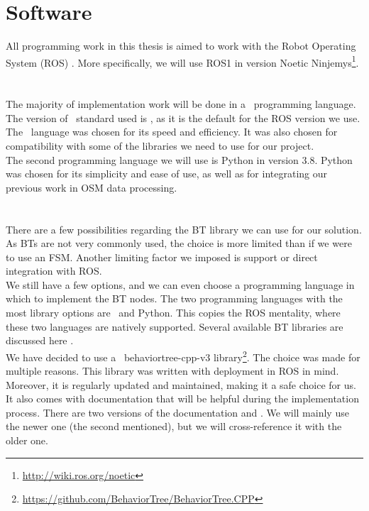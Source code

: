 \section{Software}
    All programming work in this thesis is aimed to work with the Robot Operating System (ROS) \cite{ROS}. More specifically, we will use ROS1 in version Noetic Ninjemys\footnote{\url{http://wiki.ros.org/noetic}}.\\\\
    \\
        The majority of implementation work will be done in a \CC\ programming language. The version of \CC\ standard used is , as it is the default for the ROS version we use.\\
        The \CC\ language was chosen for its speed and efficiency. It was also chosen for compatibility with some of the libraries we need to use for our project.\\
        The second programming language we will use is Python in version 3.8. Python was chosen for its simplicity and ease of use, as well as for integrating our previous work in OSM data processing.\\\\
    \\
        There are a few possibilities regarding the BT library we can use for our solution. As BTs are not very commonly used, the choice is more limited than if we were to use an FSM. Another limiting factor we imposed is support or direct integration with ROS.\\
        We still have a few options, and we can even choose a programming language in which to implement the BT nodes. The two programming languages with the most library options are \CC\ and Python. This copies the ROS mentality, where these two languages are natively supported. Several available BT libraries are discussed here \cite{BT_FSM}.\\
        We have decided to use a \CC\ behaviortree-cpp-v3 library\footnote{\url{https://github.com/BehaviorTree/BehaviorTree.CPP}}. The choice was made for multiple reasons. This library was written with deployment in ROS in mind. Moreover, it is regularly updated and maintained, making it a safe choice for us. It also comes with documentation that will be helpful during the implementation process. There are two versions of the documentation \cite{BT_docs} and \cite{BT_docs_new}. We will mainly use the newer one (the second mentioned), but we will cross-reference it with the older one.\\
